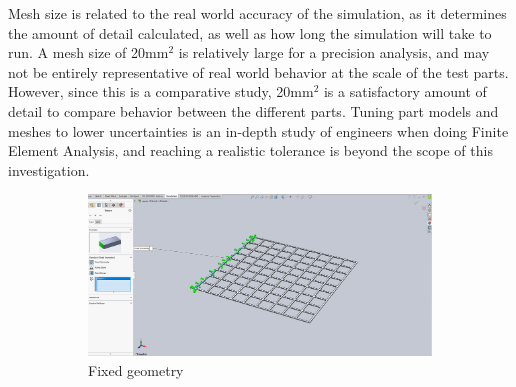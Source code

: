 \documentclass[12pt, letterpaper]{article}
\begin{document}
Mesh size is related to the real world accuracy of the simulation, as it determines the amount of detail calculated, as well as how long the simulation will take to run. A mesh size of 20mm$^2$ is relatively large for a precision analysis, and may not be entirely representative of real world behavior at the scale of the test parts. However, since this is a comparative study, 20mm$^2$ is a satisfactory amount of detail to compare behavior between the different parts. Tuning part models and meshes to lower uncertainties is an in-depth study of engineers when doing Finite Element Analysis, and reaching a realistic tolerance is beyond the scope of this investigation. 

\begin{figure}[H]
	\centering
	\label{fig:sim-settings}
	\caption{Simulation Parameters}
	\begin{subfigure}[t]{.6\linewidth}
		\includegraphics[width=\linewidth]{./procedure/fixed-geometry}
		\caption{Fixed geometry}
		\label{fig:settings-fixed}
	\end{subfigure}
	\begin{subfigure}[t]{.3\linewidth}

\end{subfigure}
\end{figure}
\end{document}
